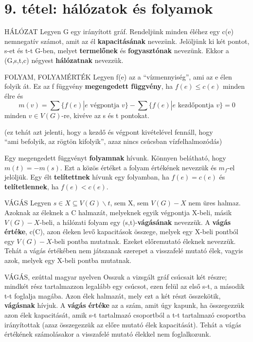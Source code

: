 \section{9. tétel: hálózatok és folyamok}

\begin{definicio}{HÁLÓZAT}
Legyen G egy irányított gráf. Rendeljünk minden éléhez egy c(e) nemnegatív számot, amit az él \textbf{kapacitásának} nevezünk. Jelöljünk ki két pontot, s-et és t-t G-ben, melyet \textbf{termelőnek} és \textbf{fogyasztónak} nevezünk. Ekkor a (G,s,t,c) négyest \textbf{hálózatnak} nevezzük.
\end{definicio}

\begin{definicio}{FOLYAM, FOLYAMÉRTÉK}
Legyen f(e) az a ``vízmennyiség'', ami az e élen folyik át. Ez az f függvény \textbf{megengedett függvény}, ha $f(e) \leq c(e)$ minden élre és
$$m(v) = \sum\{f(e)|e\,\,\text{végpontja}\,\,v\} - \sum\{f(e) | e\,\,\text{kezdőpontja}\,\,v\} = 0$$
minden $v\in V(G)$-re, kivéve az s és t pontokat.
\begin{center}
(ez tehát azt jelenti, hogy a kezdő és végpont kivételével fennáll, hogy\\``ami befolyik, az rögtön kifolyik'', azaz nincs csúcsban vízfelhalmozódás)
\end{center}
Egy megengedett függvényt \textbf{folyamnak} hívunk. Könnyen belátható, hogy $m(t) = -m(s)$. Ezt a közös értéket a folyam értékének nevezzük és $m_f$-el jelöljük. Egy élt \textbf{telítettnek} hívunk egy folyamban, ha $f(e) = c(e)$ és \textbf{telítetlennek}, ha $f(e) < c(e)$.
\end{definicio}

\begin{definicio}{VÁGÁS}
Legyen $s \in X \subseteq V(G) \backslash {t}$, sem X, sem $V(G) - X$ nem üres halmaz. Azoknak az éleknek a C halmazát, melyeknek egyik végpontja X-beli, másik $V(G) - X$-beli, a hálózati folyam egy (s,t)-\textbf{vágásának} nevezzük. A \textbf{vágás értéke}, c(C), azon éleken levő kapacitások összege, melyek egy X-beli pontból egy $V(G) - X$-beli pontba mutatnak. Ezeket előremutató éleknek nevezzük. Tehát a vágás értékében nem játszanak szerepet a visszafelé mutató élek, vagyis azok, melyek egy X-beli pontba mutatnak.
\end{definicio}

\begin{definicio}{VÁGÁS, ezúttal magyar nyelven}
  Osszuk a vizsgált gráf csúcsait két részre; mindkét rész tartalmazzon legalább egy csúcsot, ezen felül az első s-t, a második t-t foglalja magába. Azon élek halmazát, mely ezt a két részt összekötik, \textbf{vágásnak} hívjuk. A \textbf{vágás értéke} az a szám, amit úgy kapunk, ha összegezzük azon élek kapacitását, amik s-t tartalmazó csoportból a t-t tartalmazó csoportba irányítottak (azaz összegezzük az előre mutató élek kapacitását). Tehát a vágás értékének számolásakor a visszafelé mutató élekkel nem foglalkozunk.

\end{definicio}

